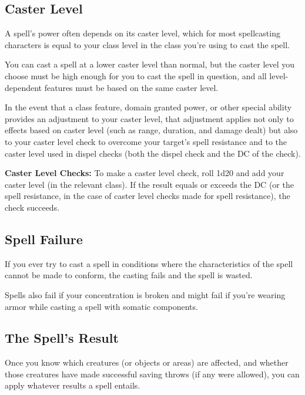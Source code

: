 


\subsection{Caster Level}
A spell's power often depends on its caster level, which for most spellcasting characters is equal to your class level in the class you're using to cast the spell.

You can cast a spell at a lower caster level than normal, but the caster level you choose must be high enough for you to cast the spell in question, and all level-dependent features must be based on the same caster level.

In the event that a class feature, domain granted power, or other special ability provides an adjustment to your caster level, that adjustment applies not only to effects based on caster level (such as range, duration, and damage dealt) but also to your caster level check to overcome your target's spell resistance and to the caster level used in dispel checks (both the dispel check and the DC of the check).

\textbf{Caster Level Checks:} To make a caster level check, roll 1d20 and add your caster level (in the relevant class). If the result equals or exceeds the DC (or the spell resistance, in the case of caster level checks made for spell resistance), the check succeeds.

\subsection{Spell Failure}
If you ever try to cast a spell in conditions where the characteristics of the spell cannot be made to conform, the casting fails and the spell is wasted.

Spells also fail if your concentration is broken and might fail if you're wearing armor while casting a spell with somatic components.

\subsection{The Spell's Result}
Once you know which creatures (or objects or areas) are affected, and whether those creatures have made successful saving throws (if any were allowed), you can apply whatever results a spell entails.




